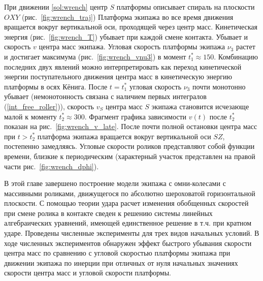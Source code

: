 При движении \ref{sol:wrench} центр $S$ платформы описывает спираль на плоскости $OXY$ (рис.~\ref{fig:wrench_traj}) Платформа экипажа во все время движения вращается вокруг вертикальной оси, проходящей через центр масс. Кинетическая энергия (рис.~\ref{fig:wrench_T}) убывает при каждой смене контакта. Убывает и скорость $v$ центра масс экипажа. Угловая скорость платформы экипажа $\nu_3$ растет и достигает максимума (рис.~\ref{fig:wrench_vnu3}) в момент $t^*_1 \approx 150$. Комбинацию последних двух явлений можно интерпретировать как переход кинетической энергии поступательного движения центра масс в кинетическую энергию платформы в осях Кёнига. После $t = t^*_1$ угловая скорость $\nu_3$ почти монотонно убывает (немонотонность связана с наличием первых интегралов (\ref{int_free_roller})), скорость $v_S$ центра масс $S$ экипажа становится исчезающе малой к моменту $t^*_2 \approx 300$. Фрагмент графика зависимости $v(t)$ после $t^*_2$ показан на рис.~\ref{fig:wrench_v_late}. После почти полной остановки центра масс при  $t > t^*_2$ платформа экипажа вращается вокруг вертикальной оси $SZ$, постепенно замедляясь. Угловые скорости роликов представляют собой функции времени, близкие к периодическим (характерный участок представлен на правой части рис.~\ref{fig:wrench_dphi}).

В этой главе завершено построение мо\-де\-ли экипажа с омни-ко\-ле\-са\-ми с массивными роликами, движущегося по абсолютно шероховатой горизонтальной плоскости. С помощью теории удара расчет изменения обобщенных скоростей при смене ролика в контакте сведен к решению системы линейных алгебраических уравнений, имеющей единственное решение в т.ч. при кратном ударе. Проведены численные эксперименты для трех видов начальных условий. В ходе численных экспериментов обнаружен эффект быстрого убывания скорости центра масс по сравнению с угловой скоростью платформы экипажа при движении экипажа по инерции при отличных от нуля начальных значениях скорости центра масс и угловой скорости платформы. 

\newpage


